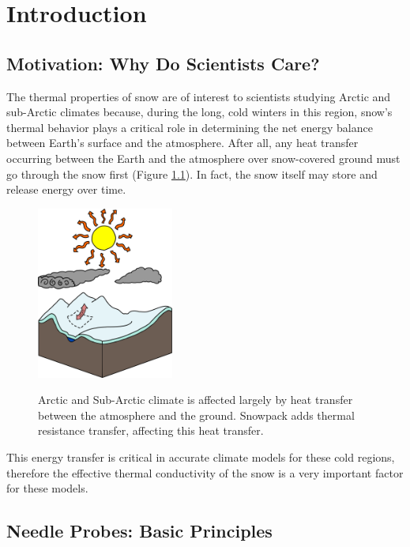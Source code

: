 \chapter{Introduction}
\label{sec:introduction}

\section{Motivation: Why Do Scientists Care?}
\label{sec:introduction:motivation}

The thermal properties of snow are of interest to scientists studying Arctic and
sub-Arctic climates because, during the long, cold winters in this region,
snow's thermal behavior plays a critical role in determining the net energy
balance between Earth's surface and the atmosphere. After all, any heat transfer
occurring between the Earth and the atmosphere over snow-covered ground must go
through the snow first (Figure \ref{fig:climate}). In fact, the snow
itself may store and release energy over time.

\begin{figure}[h]
\centering
\includegraphics[width=0.4\textwidth]{fig/climate.png}
\label{fig:climate}
\caption{Arctic and Sub-Arctic climate is affected largely by heat transfer
between the atmosphere and the ground. Snowpack adds thermal resistance
transfer, affecting this heat transfer.}
\end{figure}

This energy transfer is critical in accurate climate models for these cold
regions, therefore the effective thermal conductivity of the snow is a very
important factor for these models.

\section{Needle Probes: Basic Principles}
\label{sec:introduction:needles}

